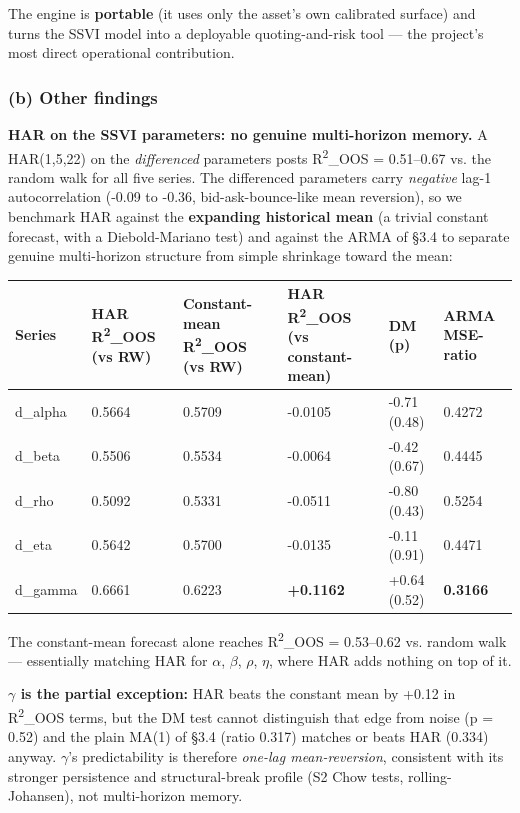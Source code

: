 \documentclass[10pt,a4paper]{article}
\begin{document}
The engine is \textbf{portable} (it uses only the asset's own calibrated surface) and turns the SSVI model into a deployable quoting-and-risk tool --- the project's most direct operational contribution.

\subsubsection*{(b) Other findings}

\noindent \textbf{HAR on the SSVI parameters: no genuine multi-horizon memory.} A HAR(1,5,22) on the \textit{differenced} parameters posts R\textsuperscript{2}\_OOS = 0.51--0.67 vs. the random walk for all five series. The differenced parameters carry \textit{negative} lag-1 autocorrelation (-0.09 to -0.36, bid-ask-bounce-like mean reversion), so we benchmark HAR against the \textbf{expanding historical mean} (a trivial constant forecast, with a Diebold-Mariano test) and against the ARMA of \S{}3.4 to separate genuine multi-horizon structure from simple shrinkage toward the mean:

\begin{center}\footnotesize
\begin{tabularx}{\textwidth}{l Y Y Y Y Y}
\toprule
\textbf{Series} & \textbf{HAR R\textsuperscript{2}\_OOS (vs RW)} & \textbf{Constant-mean R\textsuperscript{2}\_OOS (vs RW)} & \textbf{HAR R\textsuperscript{2}\_OOS (vs constant-mean)} & \textbf{DM (p)} & \textbf{ARMA MSE-ratio} \\
\midrule
d\_alpha & 0.5664 & 0.5709 & -0.0105 & -0.71 (0.48) & 0.4272 \\
d\_beta & 0.5506 & 0.5534 & -0.0064 & -0.42 (0.67) & 0.4445 \\
d\_rho & 0.5092 & 0.5331 & -0.0511 & -0.80 (0.43) & 0.5254 \\
d\_eta & 0.5642 & 0.5700 & -0.0135 & -0.11 (0.91) & 0.4471 \\
d\_gamma & 0.6661 & 0.6223 & \textbf{+0.1162} & +0.64 (0.52) & \textbf{0.3166} \\
\bottomrule
\end{tabularx}
\end{center}

The constant-mean forecast alone reaches R\textsuperscript{2}\_OOS = 0.53--0.62 vs. random walk --- essentially matching HAR for $\alpha$, $\beta$, $\rho$, $\eta$, where HAR adds nothing on top of it.

\textbf{$\gamma$ is the partial exception:} HAR beats the constant mean by +0.12 in R\textsuperscript{2}\_OOS terms, but the DM test cannot distinguish that edge from noise (p = 0.52) and the plain MA(1) of \S{}3.4 (ratio 0.317) matches or beats HAR (0.334) anyway. $\gamma$'s predictability is therefore \textit{one-lag mean-reversion}, consistent with its stronger persistence and structural-break profile (S2 Chow tests, rolling-Johansen), not multi-horizon memory.
\end{document}
